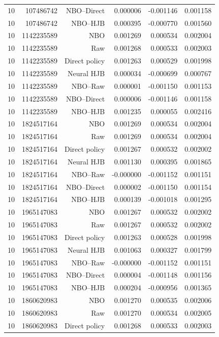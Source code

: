 \begin{longtable}{lrrrrr}
10 & 107486742 & NBO--Direct & 0.000006 & -0.001146 & 0.001158 \\
10 & 107486742 & NBO--HJB & 0.000395 & -0.000770 & 0.001560 \\
10 & 1142235589 & NBO & 0.001269 & 0.000534 & 0.002004 \\
10 & 1142235589 & Raw & 0.001268 & 0.000533 & 0.002003 \\
10 & 1142235589 & Direct policy & 0.001263 & 0.000529 & 0.001998 \\
10 & 1142235589 & Neural HJB & 0.000034 & -0.000699 & 0.000767 \\
10 & 1142235589 & NBO--Raw & 0.000001 & -0.001150 & 0.001153 \\
10 & 1142235589 & NBO--Direct & 0.000006 & -0.001146 & 0.001158 \\
10 & 1142235589 & NBO--HJB & 0.001235 & 0.000055 & 0.002416 \\
10 & 1824517164 & NBO & 0.001269 & 0.000534 & 0.002004 \\
10 & 1824517164 & Raw & 0.001269 & 0.000534 & 0.002004 \\
10 & 1824517164 & Direct policy & 0.001267 & 0.000532 & 0.002002 \\
10 & 1824517164 & Neural HJB & 0.001130 & 0.000395 & 0.001865 \\
10 & 1824517164 & NBO--Raw & -0.000000 & -0.001152 & 0.001151 \\
10 & 1824517164 & NBO--Direct & 0.000002 & -0.001150 & 0.001154 \\
10 & 1824517164 & NBO--HJB & 0.000139 & -0.001018 & 0.001295 \\
10 & 1965147083 & NBO & 0.001267 & 0.000532 & 0.002002 \\
10 & 1965147083 & Raw & 0.001267 & 0.000532 & 0.002002 \\
10 & 1965147083 & Direct policy & 0.001263 & 0.000528 & 0.001998 \\
10 & 1965147083 & Neural HJB & 0.001063 & 0.000327 & 0.001799 \\
10 & 1965147083 & NBO--Raw & -0.000000 & -0.001152 & 0.001151 \\
10 & 1965147083 & NBO--Direct & 0.000004 & -0.001148 & 0.001156 \\
10 & 1965147083 & NBO--HJB & 0.000204 & -0.000956 & 0.001365 \\
10 & 1860620983 & NBO & 0.001270 & 0.000535 & 0.002006 \\
10 & 1860620983 & Raw & 0.001270 & 0.000534 & 0.002005 \\
10 & 1860620983 & Direct policy & 0.001268 & 0.000533 & 0.002003 \\

\end{longtable}
